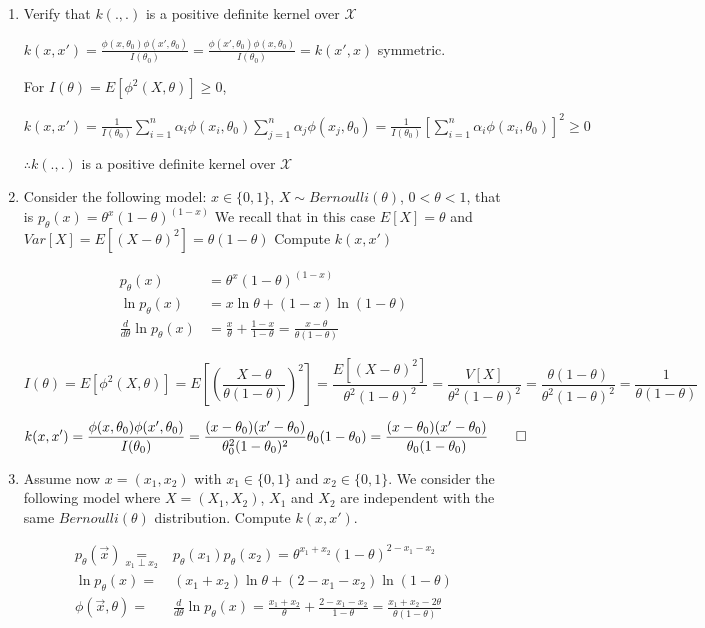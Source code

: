 \documentclass[11pt]{article}
\begin{document}
\begin{enumerate}
\item Verify that $k(.,.)$ is a positive definite kernel over $\mathcal{X}$

$k(x,x')=\frac{\phi(x,\theta_0)\phi(x',\theta_0)}{I(\theta_0)}=\frac{\phi(x',\theta_0)\phi(x,\theta_0)}{I(\theta_0)}=k(x',x)$ symmetric.

For $I(\theta)=E[\phi^2(X,\theta)]\ge0$,

$k(x,x')=\frac{1}{I(\theta_0)}\sum_{i=1}^n\alpha_i\phi(x_i,\theta_0)\sum_{j=1}^n\alpha_j\phi(x_j,\theta_0)=\frac{1}{I(\theta_0)}[\sum_{i=1}^n\alpha_i\phi(x_i,\theta_0)]^2\ge0$

$\therefore k(.,.)$ is a positive definite kernel over $\mathcal{X}$

\item Consider the following model: $x \in \{0,1\}$, $X \sim Bernoulli(\theta)$, $0 < \theta < 1$, that is
$p_\theta(x)=\theta^x(1-\theta)^{(1-x)}$
We recall that in this case $E[X]=\theta$ and $Var[X]=E[(X-\theta)^2]=\theta(1-\theta)$
Compute $k(x,x')$

\begin{align*}
p_\theta(x)&=\theta^x(1-\theta)^{(1-x)} \\
  \ln p_\theta(x)&=x\ln\theta+(1-x)\ln(1-\theta)\\
  \frac{d}{d \theta} \ln p_\theta(x)&=\frac{x}{\theta}+\frac{1-x}{1-\theta}=\frac{x-\theta}{\theta(1-\theta)}
\end{align*}

$$I(\theta)=E[\phi^2(X,\theta)]=E[(\frac{X-\theta}{\theta(1-\theta)})^2]
=\frac{E[(X-\theta)^2]}{\theta^2(1-\theta)^2}=\frac{V[X]}{\theta^2(1-\theta)^2}
=\frac{\theta(1-\theta)}{\theta^2(1-\theta)^2}=\frac{1}{\theta(1-\theta)}$$


$$k(x,x')=\frac{\phi(x,\theta_0)\phi(x',\theta_0)}{I(\theta_0)}=\frac{(x-\theta_0)(x'-\theta_0)}{\theta_0^2(1-\theta_0)^2}\theta_0(1-\theta_0)=\frac{(x-\theta_0)(x'-\theta_0)}{\theta_0(1-\theta_0)} \qquad\hfill\square$$

\item Assume now $x=(x_1,x_2)$ with $x_1 \in \{0,1\}$ and $x_2 \in \{0,1\}$. 
We consider the following model where $X=(X_1,X_2)$, $X_1$ and $X_2$ are independent with the same $Bernoulli(\theta)$ distribution. 
Compute $k(x,x')$. 

\begin{align*}
  p_\theta(\vec x)\underset{x_1\perp x_2}{=}&p_\theta(x_1)p_\theta(x_2)=\theta^{x_1+x_2}(1-\theta)^{2-x_1-x_2}\\
  \ln p_\theta(x)=&(x_1+x_2)\ln\theta+(2-x_1-x_2)\ln(1-\theta)\\
  \phi(\vec x,\theta)=& \frac{d}{d \theta} \ln p_\theta(x)=\frac{x_1+x_2}{\theta}+\frac{2-x_1-x_2}{1-\theta}=\frac{x_1+x_2-2\theta}{\theta(1-\theta)}
\end{align*}


\end{enumerate}
\end{document}
